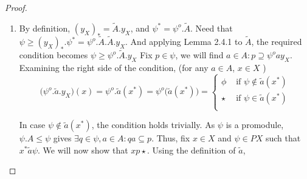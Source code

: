 \documentclass[18pt,a4paper]{article}
\theoremstyle{definition}
\begin{document}
\begin{proof}
\begin{enumerate}[label=(\alph*)]
	\item By definition, $(y_X)_*=\tilde{A}.y_X$, and $\psi^*=\psi^o.\tilde{A}$. Need that
		$\psi \geq (y_X)_*.\psi^* = \psi^o.\tilde{A}.\tilde{A}.y_X$. And applying Lemma 2.4.1 to
		$\tilde{A}$, the required condition becomes $\psi \geq \psi^o .\tilde{A} .y_X$
		Fix $p \in \psi$,
		we will find $a \in A: p \supseteq \psi^o a y_X$. Examining the right side of the condition,
		(for any $a \in A$, $x \in X$  )
		\begin{equation} \Big(\psi^o.\tilde{a} .y_X \Big) (x) = \psi^o.\tilde{a} (x^*)=
		\psi^o\big(\tilde{a}(x^*)\big)= \begin{cases}
			\phi &\text{ if } \psi \notin \tilde{a} (x^*) \\
			\star &\text{ if } \psi \in \tilde{a} (x^*) \\

		\end{cases}\end{equation}

		In case $\psi \notin \tilde{a} (x^*)$, the condition holds trivially. As $\psi$ is a
		promodule, $\psi.A\leq \psi$ gives $\exists q\in \psi, a
		\in A: qa \subseteq p$. Thus, fix $x\in X$ and	$\psi \in PX$ such that
		$x^* \tilde{a} \psi $. We will now show that $xp\star$. Using the definition of $\tilde{a}$,


\end{enumerate}
\end{proof}
\end{document}
